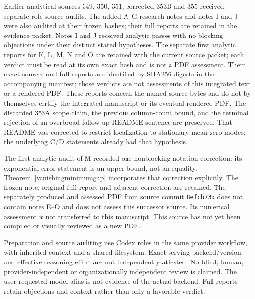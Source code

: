 \documentclass[11pt]{article}
\begin{document}
Earlier analytical sources 349, 350, 351, corrected 353B and 355 received separate-role source audits. The added A--G research notes and notes I and J were also audited at their frozen hashes; their full reports are retained in the evidence packet. Notes I and J received analytic passes with no blocking objections under their distinct stated hypotheses. The separate first analytic reports for K, L, M, N and O are retained with the current source packet; each verdict must be read at its own exact hash and is not a PDF assessment. Their exact sources and full reports are identified by SHA256 digests in the accompanying manifest; those verdicts are not assessments of this integrated text or a rendered PDF. These reports concern the named source bytes and do not by themselves certify the integrated manuscript or its eventual rendered PDF. The discarded 353A scope claim, the previous column-count bound, and the terminal rejection of an overbroad follow-up README sentence are preserved. That README was corrected to restrict localization to stationary-mean-zero modes; the underlying C/D statements already had that hypothesis.

The first analytic audit of M recorded one nonblocking notation correction:
its exponential error statement is an upper bound, not an equality.
Theorem~\ref{vanishingminimumgap} incorporates that correction explicitly.
The frozen note, original full report and adjacent correction are retained.
The separately produced and assessed PDF from source commit \texttt{8efcb73b}
does not contain notes E--O and does not assess this successor source.
Its numerical assessment is not transferred to this manuscript. This source
has not yet been compiled or visually reviewed as a new PDF.

Preparation and source auditing use Codex roles in the same provider workflow, with inherited context and a shared filesystem. Exact serving backend/version and effective reasoning effort are not independently attested. No blind, human, provider-independent or organizationally independent review is claimed. The user-requested model alias is not evidence of the actual backend. Full reports retain objections and context rather than only a favorable verdict.
\end{document}
